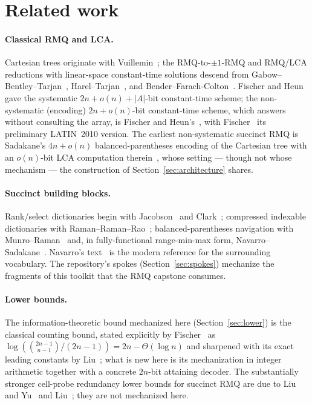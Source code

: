 \documentclass[11pt]{article}
\theoremstyle{definition}
\theoremstyle{remark}
\newcommand{\len}[1]{\lvert #1\rvert}
\begin{document}
\section{Related work}\label{sec:related}

\paragraph{Classical RMQ and LCA.}
Cartesian trees originate with Vuillemin~\cite{Vuillemin80}; the
RMQ-to-$\pm 1$-RMQ and RMQ/LCA reductions with linear-space constant-time
solutions descend from Gabow--Bentley--Tarjan~\cite{GBT84},
Harel--Tarjan~\cite{HarelTarjan84}, and
Bender--Farach-Colton~\cite{BFC00}. Fischer and Heun~\cite{FischerHeun07}
gave the systematic $2n + o(n) + \len{A}$-bit constant-time scheme; the
non-systematic (encoding) $2n + o(n)$-bit constant-time scheme, which
answers without consulting the array, is Fischer and
Heun's~\cite[Thm.~5.8, Cor.~5.9]{FischerHeun11}, with
Fischer~\cite{Fischer10} its preliminary LATIN~2010 version. The earliest
non-systematic succinct RMQ is Sadakane's $4n + o(n)$ balanced-parentheses
encoding of the Cartesian tree with an $o(n)$-bit LCA computation
therein~\cite{Sadakane07}, whose setting --- though not whose mechanism ---
the construction of Section~\ref{sec:architecture} shares.

\paragraph{Succinct building blocks.}
Rank/select dictionaries begin with Jacobson~\cite{Jacobson89} and
Clark~\cite{Clark96}; compressed indexable dictionaries with
Raman--Raman--Rao~\cite{RRR02}; balanced-parentheses navigation with
Munro--Raman~\cite{MunroRaman01} and, in fully-functional range-min-max
form, Navarro--Sadakane~\cite{NavarroSadakane14}. Navarro's
text~\cite{Navarro16} is the modern reference for the surrounding
vocabulary. The repository's spokes (Section~\ref{sec:spokes}) mechanize
the fragments of this toolkit that the RMQ capstone consumes.

\paragraph{Lower bounds.}
The information-theoretic bound mechanized here
(Section~\ref{sec:lower}) is the classical counting bound, stated
explicitly by Fischer~\cite[\S1.1]{Fischer10} as
$\log\left(\binom{2n-1}{n-1}/(2n-1)\right) = 2n - \Theta(\log n)$ and sharpened with
its exact leading constants by Liu~\cite{Liu21}; what is new here is its
mechanization in integer arithmetic together with a concrete $2n$-bit
attaining decoder. The substantially stronger cell-probe redundancy lower bounds
for succinct RMQ are due to Liu and Yu~\cite{LiuYu20} and
Liu~\cite{Liu21}; they are not mechanized here.
\end{document}
